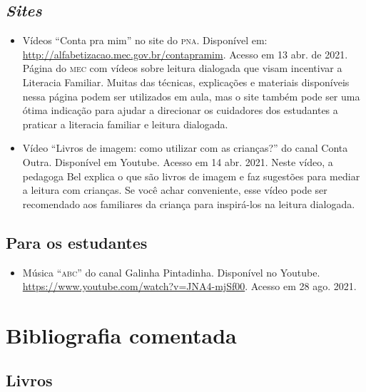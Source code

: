 \documentclass[11pt]{extarticle}
\begin{document}
\subsection{\textit{Sites}}

\begin{itemize}
\item Vídeos “Conta pra mim” no site do \textsc{pna}. Disponível em: \url{http://alfabetizacao.mec.gov.br/contapramim}. 
Acesso em 13 abr. de 2021.
Página do \textsc{mec} com vídeos sobre leitura dialogada que visam incentivar a Literacia Familiar. Muitas das 
técnicas, explicações e materiais disponíveis nessa página podem ser utilizados em aula, mas o site também 
pode ser uma ótima indicação para ajudar a direcionar os cuidadores dos estudantes a praticar 
a literacia familiar e leitura dialogada.

\item Vídeo “Livros de imagem: como utilizar com as crianças?” do canal Conta Outra. Disponível em Youtube. 
Acesso em 14 abr. 2021. 
Neste vídeo, a pedagoga Bel explica o que são livros de imagem e faz sugestões para mediar a leitura com 
crianças. Se você achar conveniente, esse vídeo pode ser recomendado aos familiares da criança 
para inspirá-los na leitura dialogada. 

\end{itemize}

\subsection{Para os estudantes}

\begin{itemize}
\item Música ``\textsc{abc}'' do canal Galinha Pintadinha. Disponível no Youtube. \url{https://www.youtube.com/watch?v=JNA4-mjSf00}. Acesso em 28 ago. 2021.


\end{itemize}


\section{Bibliografia comentada}

\subsection{Livros}
\end{document}
